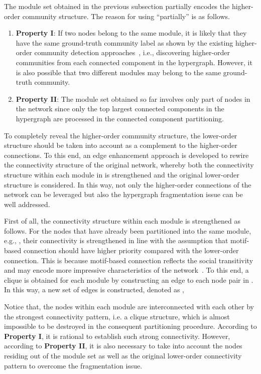 \documentclass[sigconf]{acmart}
\begin{document}
The module set  obtained in the previous subsection partially encodes the higher-order community structure. The reason for using ``partially'' is as follows.
\begin{enumerate}[{1)}]
\item \textbf{Property I}: If two nodes belong to the same module, it is likely that they have the same ground-truth community label as shown by the existing higher-order community detection approaches~\cite{arenas2008motif,benson2016higher}, i.e., discovering higher-order communities from each connected component in the hypergraph. However, it is also possible that two different modules may belong to the same ground-truth community.
\item \textbf{Property II}: The module set  obtained so far involves only part of nodes in the network since only the top  largest connected components in the hypergraph are processed in the connected component partitioning.
\end{enumerate}

To completely reveal the higher-order community structure, the lower-order structure should be taken into account as a complement to the higher-order connections. To this end, an edge enhancement approach is developed to rewire the connectivity structure of the original network, whereby both the connectivity structure within each module in  is strengthened and the original lower-order structure is considered. In this way, not only the higher-order connections of the network can be leveraged but also the hypergraph fragmentation issue can be well addressed.

First of all, the connectivity structure within each module  is strengthened as follows. For the nodes that have already been partitioned into the same module, e.g., , their connectivity is strengthened in line with the assumption that motif-based connection should have higher priority compared with the lower-order connection. This is because motif-based connection reflects the social transitivity and may encode more impressive characteristics of the network~\cite{wasserman1994social,strogatz2001exploring}. To this end, a clique is obtained for each module  by constructing an edge to each node pair in . In this way, a new set of edges is constructed, denoted as ,

Notice that, the nodes within each module  are interconnected with each other by the strongest connectivity pattern, i.e. a clique structure, which is almost impossible to be destroyed in the consequent partitioning procedure. According to \textbf{Property I}, it is rational to establish such strong connectivity. However, according to \textbf{Property II}, it is also necessary to take into account the nodes residing out of the module set as well as the original lower-order connectivity pattern to overcome the fragmentation issue.
\end{document}
